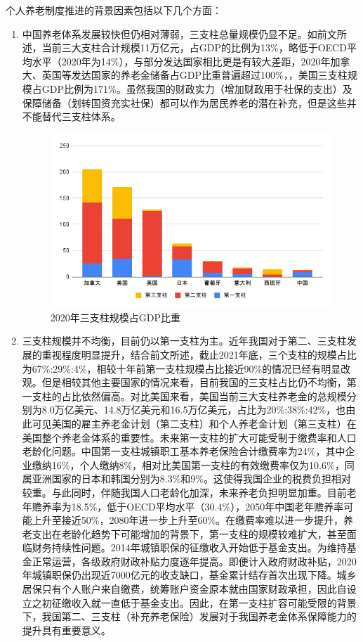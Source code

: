 \documentclass[a4paper,12pt]{ctexart}
\begin{document}
个人养老制度推进的背景因素包括以下几个方面：
\begin{enumerate}
    \item 中国养老体系发展较快但仍相对薄弱，三支柱总量规模仍显不足。如前文所述，当前三大支柱合计规模11万亿元，占GDP的比例为13\%，略低于OECD平均水平（2020年为14\%），与部分发达国家相比更是有较大差距，2020年加拿大、英国等发达国家的养老金储备占GDP比重普遍超过100\%，，美国三支柱规模占GDP比例为171\%。虽然我国的财政实力（增加财政用于社保的支出）及保障储备（划转国资充实社保）都可以作为居民养老的潜在补充，但是这些并不能替代三支柱体系。
    \begin{figure}[H]
        \centering
        \includegraphics[width=\linewidth]{img/三支柱规模占GDP比重.png}
        \caption{2020年三支柱规模占GDP比重}
        \label{fig:GDPin2020}
    \end{figure}
    \item 三支柱规模并不均衡，目前仍以第一支柱为主。近年我国对于第二、三支柱发展的重视程度明显提升，结合前文所述，截止2021年底，三个支柱的规模占比为67\%:29\%:4\%，相较十年前第一支柱规模占比接近90\%的情况已经有明显改观。但是相较其他主要国家的情况来看，目前我国的三支柱占比仍不均衡，第一支柱的占比依然偏高。对比美国来看，美国当前三大支柱养老金的总规模分别为8.0万亿美元、14.8万亿美元和16.5万亿美元，占比为20\%:38\%:42\%，也由此可见美国的雇主养老金计划（第二支柱）和个人养老金计划（第三支柱）在美国整个养老金体系的重要性。未来第一支柱的扩大可能受制于缴费率和人口老龄化问题。中国第一支柱城镇职工基本养老保险合计缴费率为24\%，其中企业缴纳16\%，个人缴纳8\%，相对比美国第一支柱的有效缴费率仅为10.6\%，同属亚洲国家的日本和韩国分别为8.3\%和9\%。这使得我国企业的税费负担相对较重。与此同时，伴随我国人口老龄化加深，未来养老负担明显加重。目前老年赡养率为18.5\%，低于OECD平均水平（30.4\%），2050年中国老年赡养率可能上升至接近50\%，2080年进一步上升至60\%。在缴费率难以进一步提升，养老支出在老龄化趋势下可能增加的背景下，第一支柱的规模较难扩大，甚至面临财务持续性问题。2014年城镇职保的征缴收入开始低于基金支出。为维持基金正常运营，各级政府财政补贴力度逐年提高。即便计入政府财政补贴，2020年城镇职保仍出现近7000亿元的收支缺口，基金累计结存首次出现下降。城乡居保只有个人账户来自缴费，统筹账户资金原本就由国家财政承担，因此自设立之初征缴收入就一直低于基金支出。因此，在第一支柱扩容可能受限的背景下，我国第二、三支柱（补充养老保险）发展对于我国养老金体系保障能力的提升具有重要意义。

\end{enumerate}
\end{document}
